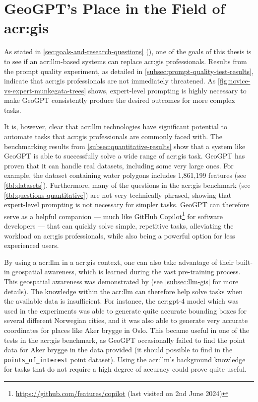 \section[GeoGPT's Place in the Field of GIS]{GeoGPT's Place in the Field of \acrshort{acr:gis}}
\label{sec:geogpt-in-gis}

As stated in \autoref{sec:goals-and-research-questions} (), one of the goals of this thesis is to see if an \acrshort{acr:llm}-based systems can replace \acrshort{acr:gis} professionals. Results from the prompt quality experiment, as detailed in \autoref{subsec:prompt-quality-test-results}, indicate that \acrshort{acr:gis} professionals are not immediately threatened. As \autoref{fig:novice-vs-expert-munkegata-trees} shows, expert-level prompting is highly necessary to make GeoGPT consistently produce the desired outcomes for more complex tasks.

It is, however, clear that \acrshort{acr:llm} technologies have significant potential to automate tasks that \acrshort{acr:gis} professionals are commonly faced with. The benchmarking results from \autoref{subsec:quantitative-results} show that a system like GeoGPT is able to successfully solve a wide range of \acrshort{acr:gis} task. GeoGPT has proven that it can handle real datasets, including some very large ones. For example, the dataset containing water polygons includes 1,861,199 features (see \autoref{tbl:datasets}). Furthermore, many of the questions in the \acrshort{acr:gis} benchmark (see \autoref{tbl:questions-quantitative}) are not very technically phrased, showing that expert-level prompting is not necessary for simpler tasks. GeoGPT can therefore serve as a helpful companion --- much like GitHub Copilot\footnote{\url{https://github.com/features/copilot} (last visited on 2nd June 2024)} for software developers --- that can quickly solve simple, repetitive tasks, alleviating the workload on \acrshort{acr:gis} professionals, while also being a powerful option for less experienced users.

By using a \acrlong{acr:llm} in a \acrshort{acr:gis} context, one can also take advantage of their built-in geospatial awareness, which is learned during the vast pre-training process. This geospatial awareness was demonstrated by \cite{robertsGPT4GEOHowLanguage2023} (see \autoref{subsec:llm-gis} for more details). The knowledge within the \acrshort{acr:llm} can therefore help solve tasks when the available data is insufficient. For instance, the \acrshort{acr:gpt}-4 model which was used in the experiments was able to generate quite accurate bounding boxes for several different Norwegian cities, and it was also able to generate very accurate coordinates for places like Aker brygge in Oslo. This became useful in one of the tests in the \acrshort{acr:gis} benchmark, as GeoGPT occasionally failed to find the point data for Aker brygge in the data provided (it should possible to find in the \texttt{points\_of\_interest} point dataset). Using the \acrshort{acr:llm}'s background knowledge for tasks that do not require a high degree of accuracy could prove quite useful.

